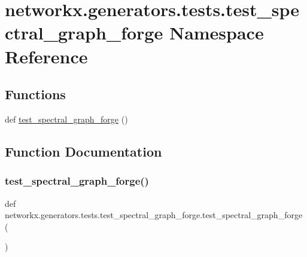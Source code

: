 \hypertarget{namespacenetworkx_1_1generators_1_1tests_1_1test__spectral__graph__forge}{}\section{networkx.\+generators.\+tests.\+test\+\_\+spectral\+\_\+graph\+\_\+forge Namespace Reference}
\label{namespacenetworkx_1_1generators_1_1tests_1_1test__spectral__graph__forge}
\subsection*{Functions}
\begin{DoxyCompactItemize}
\item 
def \hyperlink{namespacenetworkx_1_1generators_1_1tests_1_1test__spectral__graph__forge_a047192a8bf177b217e8d4da573b52dc4}{test\+\_\+spectral\+\_\+graph\+\_\+forge} ()
\end{DoxyCompactItemize}


\subsection{Function Documentation}
\mbox{\label{namespacenetworkx_1_1generators_1_1tests_1_1test__spectral__graph__forge_a047192a8bf177b217e8d4da573b52dc4}} 
\subsubsection{\texorpdfstring{test\+\_\+spectral\+\_\+graph\+\_\+forge()}{test\_spectral\_graph\_forge()}}
{\footnotesize\ttfamily def networkx.\+generators.\+tests.\+test\+\_\+spectral\+\_\+graph\+\_\+forge.\+test\+\_\+spectral\+\_\+graph\+\_\+forge (\begin{DoxyParamCaption}{ }\end{DoxyParamCaption})}

